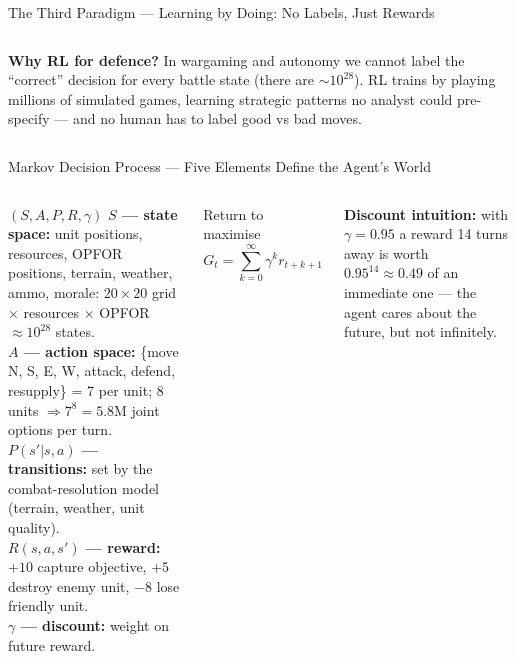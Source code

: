 \documentclass[aspectratio=169,10pt,t]{beamer}
\begin{document}
\begin{frame}{The Third Paradigm --- Learning by Doing: No Labels, Just Rewards}
\begin{columns}[T]
{\begin{tikzpicture}
\end{tikzpicture}}
\begin{rbox}\scriptsize\textbf{Why RL for defence?} In wargaming and autonomy we cannot label the ``correct'' decision for every battle state (there are $\sim10^{28}$). RL trains by playing millions of simulated games, learning strategic patterns no analyst could pre-specify --- and no human has to label good vs bad moves.\end{rbox}
\end{columns}
\end{frame}

\begin{frame}{Markov Decision Process --- Five Elements Define the Agent's World}
\begin{columns}[T]
\begin{cbox}{$(S,A,P,R,\gamma)$}\scriptsize
\textbf{$S$ --- state space:} unit positions, resources, OPFOR positions, terrain, weather, ammo, morale: $20\times20$ grid $\times$ resources $\times$ OPFOR $\approx10^{28}$ states.\\[2pt]
\textbf{$A$ --- action space:} \{move N, S, E, W, attack, defend, resupply\} = 7 per unit; 8 units $\Rightarrow7^{8}=5.8$M joint options per turn.\\[2pt]
\textbf{$P(s'|s,a)$ --- transitions:} set by the combat-resolution model (terrain, weather, unit quality).\\[2pt]
\textbf{$R(s,a,s')$ --- reward:} $+10$ capture objective, $+5$ destroy enemy unit, $-8$ lose friendly unit.\\[2pt]
\textbf{$\gamma$ --- discount:} weight on future reward.\end{cbox}
\begin{fbx}{Return to maximise}\[G_t=\sum_{k=0}^{\infty}\gamma^{k}r_{t+k+1}\]\end{fbx}
\begin{ibox}\scriptsize\textbf{Discount intuition:} with $\gamma=0.95$ a reward 14 turns away is worth $0.95^{14}\approx0.49$ of an immediate one --- the agent cares about the future, but not infinitely.\end{ibox}
\end{columns}
\end{frame}
\end{document}
